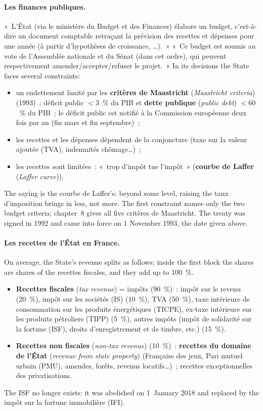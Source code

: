 \paragraph{Les finances publiques.} «~L'État (via le ministère du Budget et des
Finances) élabore un budget, c'est-à-dire un document comptable retraçant la
prévision des recettes et dépenses pour une année (à partir d'hypothèses de
croissance, \ldots).~» «~Ce budget est soumis au vote de l'Assemblée nationale
et du Sénat (dans cet ordre), qui peuvent respectivement
amender/accepter/refuser le projet.~» In its decisions the State faces several
constraints:
\begin{itemize}
  \item un endettement limité par les \textbf{critères de Maastricht}
    (\textit{Maastricht criteria}) (1993)~: déficit public $< 3$~\% du PIB et
    \textbf{dette publique} (\textit{public debt}) $< 60$~\% du PIB~; le déficit
    public est notifié à la Commission européenne deux fois par an (fin mars et
    fin septembre)~;
  \item les recettes et les dépenses dépendent de la conjoncture (taxe sur la
    valeur ajoutée (TVA), indemnités chômage\ldots)~;
  \item les recettes sont limitées~: «~trop d'impôt tue l'impôt~»
    (\textbf{courbe de Laffer} (\textit{Laffer curve})).
\end{itemize}
The saying is the courbe de Laffer's: beyond some level, raising the taux d'imposition
brings in less, not more. The first constraint names only the two budget criteria;
chapter~8 gives all five critères de Maastricht. The treaty was signed in 1992 and came
into force on 1 November 1993, the date given above.

\paragraph{Les recettes de l'État en France.} On average, the State's revenue
splits as follows; inside the first block the shares are shares of the
recettes fiscales, and they add up to 100~\%.
\begin{itemize}
  \item \textbf{Recettes fiscales} (\textit{tax revenue}) = impôts (90~\%)~:
    impôt sur le revenu (20~\%), impôt sur les sociétés (IS) (10~\%), TVA
    (50~\%), taxe intérieure de consommation sur les produits énergétiques
    (TICPE), ex-taxe intérieure sur les produits pétroliers (TIPP) (5~\%),
    autres impôts (impôt de solidarité sur la fortune (ISF), droits
    d'enregistrement et de timbre, etc.) (15~\%).
  \item \textbf{Recettes non fiscales} (\textit{non-tax revenue}) (10~\%)~:
    \textbf{recettes du domaine de l'État} (\textit{revenue from state property})
    (Française des jeux, Pari mutuel urbain (PMU), amendes, forêts, revenus locatifs\ldots)~; recettes
    exceptionnelles des privatisations.
\end{itemize}
The ISF no longer exists: it was abolished on 1~January 2018 and replaced by the
impôt sur la fortune immobilière (IFI).

